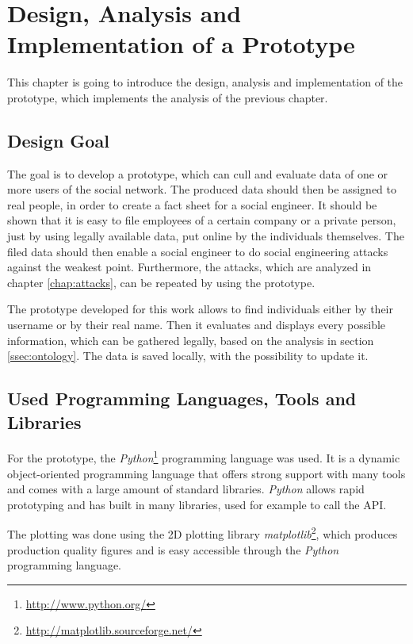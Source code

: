 \chapter{Design, Analysis and Implementation of a Prototype}
\label{chap:prototype}

This chapter is going to introduce the design, analysis and implementation of
the prototype, which implements the analysis of the previous chapter.

\section{Design Goal}

The goal is to develop a prototype, which can cull and evaluate data of one or
more users of the \Twitter{} social network. The produced data should then be
assigned to real people, in order to create a fact sheet for a social engineer.
It should be shown that it is easy to file employees of a certain company or a
private person, just by using legally available data, put online by the
individuals themselves. The filed data should then enable a social engineer to
do social engineering attacks against the weakest point. Furthermore, the
attacks, which are analyzed in chapter \ref{chap:attacks}, can be repeated by
using the prototype.

The prototype developed for this work allows to find individuals either by
their username or by their real name. Then it evaluates and displays every
possible information, which can be gathered legally, based on the analysis in
section \ref{ssec:ontology}. The data is saved locally, with the possibility to
update it.

\section{Used Programming Languages, Tools and Libraries}

For the prototype, the \textit{Python}\footnote{\url{http://www.python.org/}}
programming language was used. It is a dynamic object-oriented programming
language that offers strong support with many tools and comes with a large
amount of standard libraries. \textit{Python} allows rapid prototyping and has
built in many libraries, used for example to call the \Twitter{} API.

The plotting was done using the 2D plotting library
\textit{matplotlib}\footnote{\url{http://matplotlib.sourceforge.net/}}, which
produces production quality figures and is easy accessible through the
\textit{Python} programming language.

